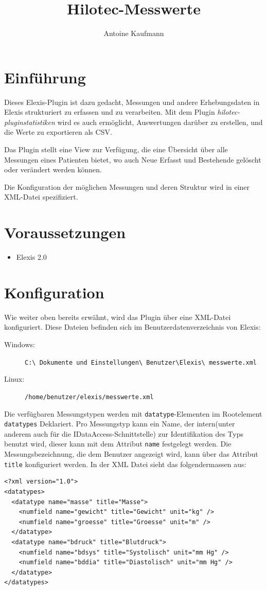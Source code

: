 \documentclass[a4paper]{scrartcl}
\title{Hilotec-Messwerte}
\author{Antoine Kaufmann}
\begin{document}
\maketitle
\section{Einführung}
Dieses Elexis-Plugin ist dazu gedacht, Messungen und andere Erhebungsdaten in
Elexis strukturiert zu erfassen und zu verarbeiten. Mit dem Plugin
\textit{hilotec-pluginstatistiken} wird es auch ermöglicht, Auswertungen
darüber zu erstellen, und die Werte zu exportieren als CSV.

Das Plugin stellt eine View zur Verfügung, die eine Übersicht über alle
Messungen eines Patienten bietet, wo auch Neue Erfasst und Bestehende gelöscht
oder verändert werden können.

Die Konfiguration der möglichen Messungen und deren Struktur wird in einer
XML-Datei spezifiziert.


\section{Voraussetzungen}
\begin{itemize}
    \item Elexis 2.0
\end{itemize}

\section{Konfiguration}
Wie weiter oben bereits erwähnt, wird das Plugin über eine XML-Datei
konfiguriert. Diese Dateien befinden sich im Benutzerdatenverzeichnis von
Elexis:
\begin{description}
    \item[Windows:] \texttt{C:\textbackslash
                                Dokumente und Einstellungen\textbackslash
                                Benutzer\textbackslash Elexis\textbackslash
                                messwerte.xml}
    \item[Linux:] \texttt{/home/benutzer/elexis/messwerte.xml}
\end{description}

Die verfügbaren Messungstypen werden mit \texttt{datatype}-Elementen im
Rootelement \texttt{datatypes} Deklariert. Pro Messungstyp kann ein Name, der
intern(unter anderem auch für die IDataAccess-Schnittstelle) zur Identifikation
des Typs benutzt wird, dieser kann mit dem Attribut \texttt{name} festgelegt
werden. Die Messungsbezeichnung, die dem Benutzer angezeigt wird, kann über das
Attribut \texttt{title} konfiguriert werden. In der XML Datei sieht das
folgendermassen aus:
\begin{lstlisting}
<?xml version="1.0">
<datatypes>
  <datatype name="masse" title="Masse">
    <numfield name="gewicht" title="Gewicht" unit="kg" />
    <numfield name="groesse" title="Groesse" unit="m" />
  </datatype>
  <datatype name="bdruck" title="Blutdruck">
    <numfield name="bdsys" title="Systolisch" unit="mm Hg" />
    <numfield name="bddia" title="Diastolisch" unit="mm Hg" />
  </datatype>
</datatypes>
\end{lstlisting}
\end{document}
